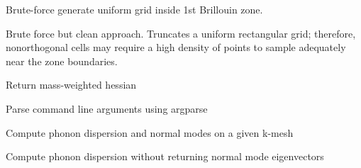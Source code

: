 \documentclass[letterpaper,10pt,english]{sphinxmanual}
\begin{document}
\begin{fulllineitems}
\label{\detokenize{tools:tools.phonon.make_brillouin_zone3D}}
Brute-force generate uniform grid inside 1st Brillouin zone.

Brute force but clean approach. Truncates a uniform rectangular grid;
therefore, nonorthogonal cells may require a high density of points to
sample adequately near the zone boundaries.

\end{fulllineitems}


\begin{fulllineitems}
\label{\detokenize{tools:tools.phonon.mass_weight}}
Return mass-weighted hessian

\end{fulllineitems}


\begin{fulllineitems}
\label{\detokenize{tools:tools.phonon.parseargs}}
Parse command line arguments using argparse

\end{fulllineitems}


\begin{fulllineitems}
\label{\detokenize{tools:tools.phonon.phonon}}
Compute phonon dispersion and normal modes on a given k-mesh

\end{fulllineitems}


\begin{fulllineitems}
\label{\detokenize{tools:tools.phonon.phonon_freqs}}
Compute phonon dispersion without returning normal mode eigenvectors

\end{fulllineitems}
\end{document}
